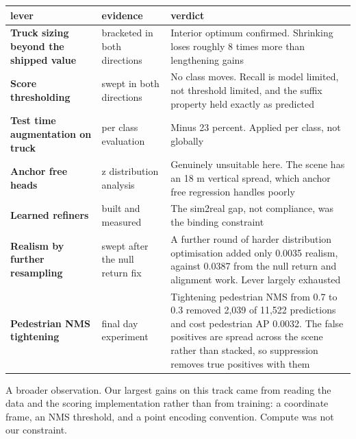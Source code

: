 \documentclass[
  10pt,
]{article}
\newcounter{none} %
\begin{document}
{\def\LTcaptype{none} %
\begin{longtable}[]{@{}
  >{\raggedright\arraybackslash}p{}
  >{\raggedright\arraybackslash}p{}
  >{\raggedright\arraybackslash}p{}@{}}
\toprule\noalign{}
\begin{minipage}[b]{\linewidth}\raggedright
lever
\end{minipage} & \begin{minipage}[b]{\linewidth}\raggedright
evidence
\end{minipage} & \begin{minipage}[b]{\linewidth}\raggedright
verdict
\end{minipage} \\
\midrule\noalign{}
\endhead
\bottomrule\noalign{}
\endlastfoot
\textbf{Truck sizing beyond the shipped value} & bracketed in both
directions & Interior optimum confirmed. Shrinking loses roughly 8 times
more than lengthening gains \\
\textbf{Score thresholding} & swept in both directions & No class moves.
Recall is model limited, not threshold limited, and the suffix property
held exactly as predicted \\
\textbf{Test time augmentation on truck} & per class evaluation & Minus
23 percent. Applied per class, not globally \\
\textbf{Anchor free heads} & z distribution analysis & Genuinely
unsuitable here. The scene has an 18 m vertical spread, which anchor
free regression handles poorly \\
\textbf{Learned refiners} & built and measured & The sim2real gap, not
compliance, was the binding constraint \\
\textbf{Realism by further resampling} & swept after the null return fix
& A further round of harder distribution optimisation added only 0.0035
realism, against 0.0387 from the null return and alignment work. Lever
largely exhausted \\
\textbf{Pedestrian NMS tightening} & final day experiment & Tightening
pedestrian NMS from 0.7 to 0.3 removed 2,039 of 11,522 predictions and
cost pedestrian AP 0.0032. The false positives are spread across the
scene rather than stacked, so suppression removes true positives with
them \\
\end{longtable}
}

A broader observation. Our largest gains on this track came from reading
the data and the scoring implementation rather than from training: a
coordinate frame, an NMS threshold, and a point encoding convention.
Compute was not our constraint.
\end{document}

